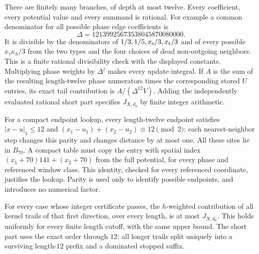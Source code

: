 There are finitely many branches, of depth at most twelve.
Every coefficient, every potential value and every summand is
rational. For example a common denominator for all possible phase
edge coefficients is
\[
 \Delta=12139925673538045870080000.
\]
It is divisible by the denominators of \(1/3,1/5,x_{\rm s}/3,
x_{\rm t}/3\) and of every possible
\(x_\tau\kappa_h/3\) from the two types and the four choices of
dead non-outgoing neighbors. This is a finite rational divisibility
check with the displayed constants. Multiplying phase weights by
\(\Delta^j\) makes every update integral. If \(A\) is the sum
of the resulting length-twelve phase numerators times the
corresponding stored \(U\) entries, its exact tail contribution is
\(A/(\Delta^{12}V)\). Adding the independently evaluated rational
short part specifies \(J_{X,d_0}\) by finite integer arithmetic.

For a compact endpoint lookup, every length-twelve endpoint satisfies
\(|x-u|_1\le12\) and
\((x_1-u_1)+(x_2-u_2)\equiv12\pmod2\): each nearest-neighbor
step changes this parity and changes distance by at most one.
All these sites lie in \(B_{70}\). A compact table must copy the
entry with spatial index
\((x_1+70)141+(x_2+70)\) from the full potential, for every phase
and referenced window class. This identity, checked for every
referenced coordinate, justifies the lookup. Parity is used only
to identify possible endpoints, and introduces no numerical factor.

\begin{lemma}\label{l:prefix-domination}
For every case whose integer certificate passes, the \(h\)-weighted
contribution of all kernel trails of that first direction,
over every length, is at most \(J_{X,d_0}\).
This holds uniformly for every finite length cutoff, with the same
upper bound. The short part uses the exact order through \(12\);
all longer trails split uniquely into a surviving length-\(12\)
prefix and a dominated stopped suffix.
\end{lemma}

